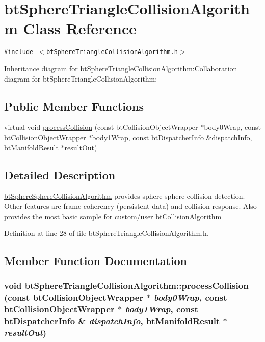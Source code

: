 \hypertarget{classbt_sphere_triangle_collision_algorithm}{
\section{btSphereTriangleCollisionAlgorithm Class Reference}
\label{classbt_sphere_triangle_collision_algorithm}
}
{\tt \#include $<$btSphereTriangleCollisionAlgorithm.h$>$}

Inheritance diagram for btSphereTriangleCollisionAlgorithm:Collaboration diagram for btSphereTriangleCollisionAlgorithm:\subsection*{Public Member Functions}
\begin{CompactItemize}
\item 
virtual void \hyperlink{classbt_sphere_triangle_collision_algorithm_f6de517d0a45abb91df4f61c5867c8f1}{processCollision} (const btCollisionObjectWrapper $\ast$body0Wrap, const btCollisionObjectWrapper $\ast$body1Wrap, const btDispatcherInfo \&dispatchInfo, \hyperlink{classbt_manifold_result}{btManifoldResult} $\ast$resultOut)
\end{CompactItemize}


\subsection{Detailed Description}
\hyperlink{classbt_sphere_sphere_collision_algorithm}{btSphereSphereCollisionAlgorithm} provides sphere-sphere collision detection. Other features are frame-coherency (persistent data) and collision response. Also provides the most basic sample for custom/user \hyperlink{classbt_collision_algorithm}{btCollisionAlgorithm} 

Definition at line 28 of file btSphereTriangleCollisionAlgorithm.h.

\subsection{Member Function Documentation}
\hypertarget{classbt_sphere_triangle_collision_algorithm_f6de517d0a45abb91df4f61c5867c8f1}{
\subsubsection[processCollision]{\setlength{\rightskip}{0pt plus 5cm}void btSphereTriangleCollisionAlgorithm::processCollision (const btCollisionObjectWrapper $\ast$ {\em body0Wrap}, \/  const btCollisionObjectWrapper $\ast$ {\em body1Wrap}, \/  const btDispatcherInfo \& {\em dispatchInfo}, \/  {\bf btManifoldResult} $\ast$ {\em resultOut})}}
\label{classbt_sphere_triangle_collision_algorithm_f6de517d0a45abb91df4f61c5867c8f1}





